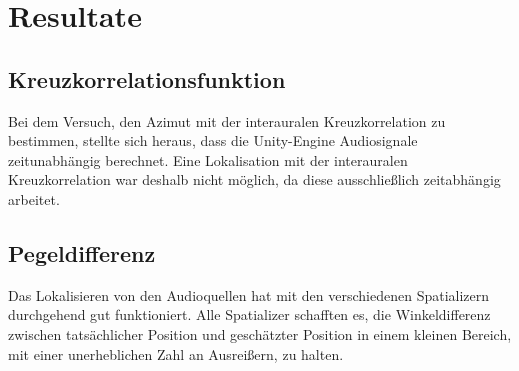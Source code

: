 \documentclass[12pt,a4paper]{article}
\begin{document}
\section{Resultate}
\subsection{Kreuzkorrelationsfunktion}
Bei dem Versuch, den Azimut mit der interauralen Kreuzkorrelation zu bestimmen, stellte sich heraus, dass die Unity-Engine Audiosignale zeitunabhängig berechnet. Eine Lokalisation mit der interauralen Kreuzkorrelation war deshalb nicht möglich, da diese ausschließlich zeitabhängig arbeitet.

\subsection{Pegeldifferenz}
Das Lokalisieren von den Audioquellen hat mit den verschiedenen Spatializern durchgehend gut funktioniert. Alle Spatializer schafften es, die Winkeldifferenz zwischen tatsächlicher Position und geschätzter Position in einem kleinen Bereich, mit einer unerheblichen Zahl an Ausreißern, zu halten.\\
\end{document}
